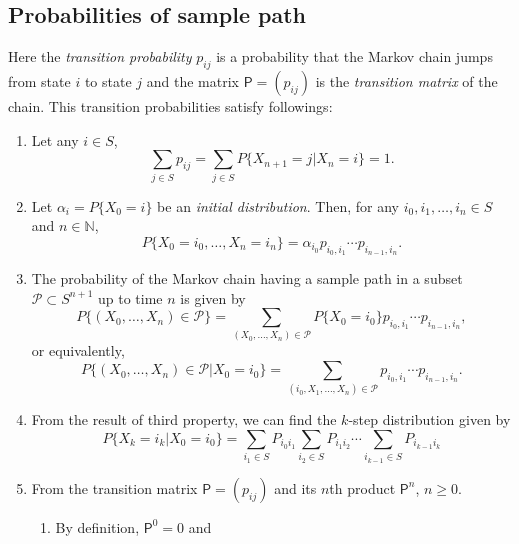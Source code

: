 \documentclass[twoside]{article}
\theoremstyle{definition}
\theoremstyle{remark}
\theoremstyle{remark}
\begin{document}
\subsection{Probabilities of sample path}
Here the \textit{transition probability} $p_{ij}$ is a probability that
the Markov chain jumps from state $i$ to state $j$ and the matrix
$\mathsf{P} = (p_{ij})$ is the \textit{transition matrix} of the chain.
This transition probabilities satisfy followings:
\begin{enumerate}
  \item Let any $i \in S$,
  \begin{equation}
    \sum_{j \in S} p_{ij} = \sum_{j \in S} P{\{X_{n+1} = j | X_n = i\}} = 1.
  \end{equation}
  \item Let $\alpha_i = P{\{ X_0 = i \}}$ be an \textit{initial distribution}.
  Then, for any $i_0, i_1, \ldots, i_n \in S$ and $n \in \mathbb{N}$,
  \begin{equation}
    P{\{ X_0 = i_0, \ldots, X_n = i_n \}} = \alpha_{i_0} p_{i_0, i_1} \cdots p_{i_{n-1}, i_n}.
  \end{equation}
  \item The probability of the Markov chain having a sample path in a subset
  $\mathcal{P} \subset S^{n+1}$ up to time $n$ is given by
  \begin{equation}
    P{\{ (X_0, \ldots, X_n) \in \mathcal{P} \}}
    = \sum_{(X_0, \ldots, X_n) \in \mathcal{P}} P{\{ X_0 = i_0 \}} p_{i_0, i_1} \cdots p_{i_{n-1}, i_n},
  \end{equation}
  or equivalently,
  \begin{equation}
    P{\{ (X_0, \ldots, X_n) \in \mathcal{P} | X_0 = i_0 \}}
    = \sum_{(i_0, X_1, \ldots, X_n) \in \mathcal{P}} p_{i_0, i_1} \cdots p_{i_{n-1}, i_n}.
  \end{equation}
  \item From the result of third property, we can find the $k$-step distribution
  given by
  \begin{equation}
    P{\{ X_k = i_k | X_0 = i_0 \}}
    = \sum_{i_1 \in S} P_{i_0 i_1}
      \sum_{i_2 \in S} P_{i_1 i_2} \cdots
      \sum_{i_{k-1} \in S} P_{i_{k-1} i_k}
  \end{equation}
  \item From the transition matrix $\mathsf{P} = (p_{ij})$ and its $n$th
  product $\mathsf{P}^n$, $n \geq 0$.
  \begin{enumerate}
    \item By definition, $\mathsf{P}^0 = 0$ and

\end{enumerate}
\end{enumerate}
\end{document}
